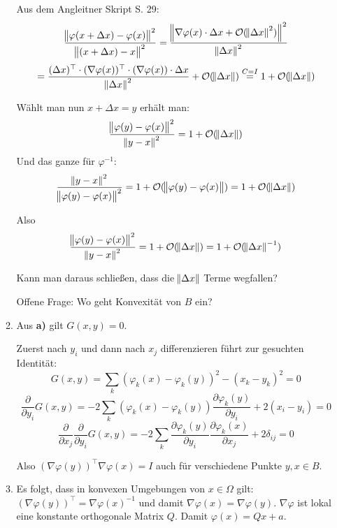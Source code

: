 \documentclass[a4paper,11pt]{scrartcl}
\newcommand*{\Ld}{\mathcal{O}}
\newcommand*{\pyi}[1]{\frac{\partial{#1}}{\partial y_i}}
\newcommand*{\pxj}[1]{\frac{\partial{#1}}{\partial x_j}}
\newcommand*{\Dx}{\Delta{}x}
\begin{document}
\begin{enumerate}[label*=\textbf{9.\arabic*.}]
\begin{enumerate}
    Aus dem Angleitner Skript S. 29:
    \[
      \frac{\norm{\varphi(x+\Dx) - \varphi(x)}^2}{\norm{(x + \Dx) - x}^2}
    = \frac{\norm{\nabla\varphi(x)\cdot \Dx + \Ld(\norm{\Delta
          x}^2)}^2}{\norm{\Dx}^2}\]
    \[= \frac{(\Dx)^\top \cdot
      (\nabla\varphi(x))^\top \cdot (\nabla\varphi(x))\cdot \Dx}{\norm{\Delta
        x}^2} + \Ld(\norm{\Dx}) \overset{C=I}{=} 1 + \Ld(\norm{\Dx}) \]

  Wählt man nun $x + \Dx = y$ erhält man:
\[ \frac{\norm{\varphi(y) - \varphi(x)}^2}{\norm{y - x}^2} = 1 +
  \Ld(\norm{\Dx}) \]
Und das ganze für $\varphi^{-1}$:
\[ \frac{\norm{y - x}^2}{\norm{\varphi(y) - \varphi(x)}^2} = 1 +
  \Ld(\norm{\varphi(y)-\varphi(x)}) = 1 + \Ld(\norm{\Dx})\]

Also
\[ \frac{\norm{\varphi(y) - \varphi(x)}^2}{\norm{y - x}^2} = 1 +
  \Ld(\norm{\Dx}) = 1 + \Ld(\norm{\Dx}^{-1}) \]

Kann man daraus schließen, dass die $\norm{\Dx}$ Terme wegfallen?

Offene Frage: Wo geht Konvexität von $B$ ein?

  \item
    Aus \textbf{a)} gilt $G(x, y) = 0$.

    Zuerst nach $y_i$ und dann nach $x_j$ differenzieren führt zur gesuchten Identität:
    \[G(x, y) = \sum_k (\varphi_k(x) - \varphi_k(y))^2 - (x_k - y_k)^2 = 0\]
    \[\pyi{}G(x,y) = -2 \sum_k (\varphi_k(x) - \varphi_k(y)) \pyi{\varphi_k(y)}
      + 2 (x_i - y_i) = 0\]
    \[\pxj{}\pyi{}G(x,y) = -2 \sum_k \pyi{\varphi_k(y)} \pxj{\varphi_k(x)}
      + 2 \delta_{ij} = 0\]

    Also $(\nabla\varphi(y))^\top \nabla\varphi(x) = I$ auch für verschiedene
    Punkte $y, x \in B$.

  \item
    Es folgt, dass in konvexen Umgebungen von $x \in \Omega$ gilt: $(\nabla
    \varphi(y))^\top = \nabla \varphi(x)^{-1}$ und damit $\nabla \varphi(x) =
    \nabla \varphi(y)$. $\nabla\varphi$ ist lokal eine konstante orthogonale
    Matrix $Q$. Damit $\varphi(x) = Q x + a$.
\end{enumerate}

\end{enumerate}
\end{document}
